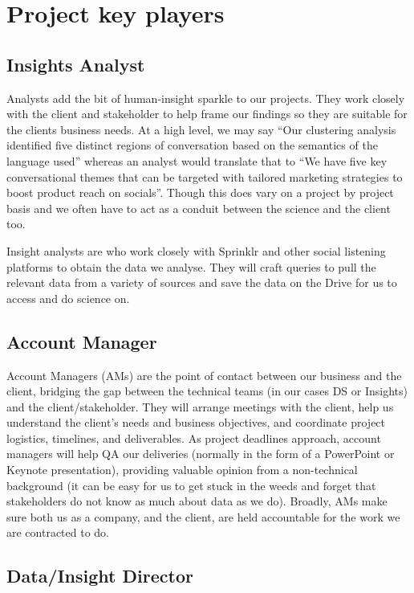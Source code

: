 \documentclass[
  letterpaper,
  DIV=11,
  numbers=noendperiod]{scrreprt}
\begin{document}
\chapter{Project key players}\label{project-key-players}

\section{Insights Analyst}\label{insights-analyst}

Analysts add the bit of human-insight sparkle to our projects. They work
closely with the client and stakeholder to help frame our findings so
they are suitable for the clients business needs. At a high level, we
may say ``Our clustering analysis identified five distinct regions of
conversation based on the semantics of the language used'' whereas an
analyst would translate that to ``We have five key conversational themes
that can be targeted with tailored marketing strategies to boost product
reach on socials''. Though this does vary on a project by project basis
and we often have to act as a conduit between the science and the client
too.

Insight analysts are who work closely with Sprinklr and other social
listening platforms to obtain the data we analyse. They will craft
queries to pull the relevant data from a variety of sources and save the
data on the Drive for us to access and do science on.

\section{Account Manager}\label{account-manager}

Account Managers (AMs) are the point of contact between our business and
the client, bridging the gap between the technical teams (in our cases
DS or Insights) and the client/stakeholder. They will arrange meetings
with the client, help us understand the client's needs and business
objectives, and coordinate project logistics, timelines, and
deliverables. As project deadlines approach, account managers will help
QA our deliveries (normally in the form of a PowerPoint or Keynote
presentation), providing valuable opinion from a non-technical
background (it can be easy for us to get stuck in the weeds and forget
that stakeholders do not know as much about data as we do). Broadly, AMs
make sure both us as a company, and the client, are held accountable for
the work we are contracted to do.

\section{Data/Insight Director}\label{datainsight-director}
\end{document}
